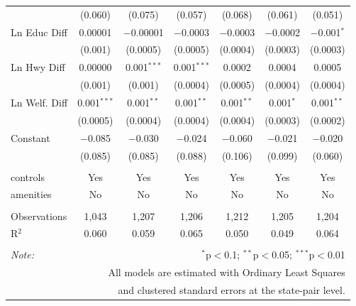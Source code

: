 \begin{table}[!htbp]
\begin{tabular}{@{\extracolsep{5pt}}lcccccc}
  & (0.060) & (0.075) & (0.057) & (0.068) & (0.061) & (0.051) \\ 
  Ln Educ Diff & 0.00001 & $-$0.00001 & $-$0.0003 & $-$0.0003 & $-$0.0002 & $-$0.001$^{*}$ \\ 
  & (0.001) & (0.0005) & (0.0005) & (0.0004) & (0.0003) & (0.0003) \\ 
  Ln Hwy Diff & 0.00000 & 0.001$^{***}$ & 0.001$^{***}$ & 0.0002 & 0.0004 & 0.0005 \\ 
  & (0.001) & (0.001) & (0.0004) & (0.0005) & (0.0004) & (0.0004) \\ 
  Ln Welf. Diff & 0.001$^{***}$ & 0.001$^{**}$ & 0.001$^{**}$ & 0.001$^{**}$ & 0.001$^{*}$ & 0.001$^{**}$ \\ 
  & (0.0005) & (0.0004) & (0.0004) & (0.0004) & (0.0003) & (0.0002) \\ 
  Constant & $-$0.085 & $-$0.030 & $-$0.024 & $-$0.060 & $-$0.021 & $-$0.020 \\ 
  & (0.085) & (0.085) & (0.088) & (0.106) & (0.099) & (0.060) \\ 
 \hline \\[-1.8ex] 
controls & Yes & Yes & Yes & Yes & Yes & Yes \\ 
amenities & No & No & No & No & No & No \\ 
\hline \\[-1.8ex] 
Observations & 1,043 & 1,207 & 1,206 & 1,212 & 1,205 & 1,204 \\ 
R$^{2}$ & 0.060 & 0.059 & 0.065 & 0.050 & 0.049 & 0.064 \\ 
\hline 
\hline \\[-1.8ex] 
\textit{Note:}  & \multicolumn{6}{r}{$^{*}$p$<$0.1; $^{**}$p$<$0.05; $^{***}$p$<$0.01} \\ 
 & \multicolumn{6}{r}{All models are estimated with Ordinary Least Squares} \\ 
 & \multicolumn{6}{r}{and clustered standard errors at the state-pair level.} \\ 
\end{tabular} 
\end{table} 
